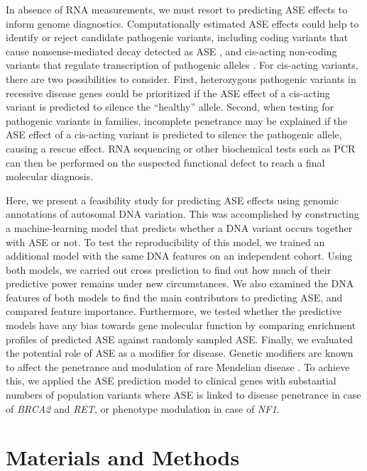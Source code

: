 \documentclass{book}
\begin{document}
\begin{refsection}
In absence of RNA measurements, we must resort to predicting ASE effects to inform genome diagnostics.
Computationally estimated ASE effects could help to identify or reject candidate pathogenic variants, including coding variants that cause nonsense-mediated decay detected as ASE \cite{Miller2014Nonsense}, and cis-acting non-coding variants that regulate transcription of pathogenic alleles \cite{Rao2019Allele}.
For cis-acting variants, there are two possibilities to consider.
First, heterozygous pathogenic variants in recessive disease genes could be prioritized if the ASE effect of a cis-acting variant is predicted to silence the \enquote{healthy} allele.
Second, when testing for pathogenic variants in families, incomplete penetrance may be explained if the ASE effect of a cis-acting variant is predicted to silence the pathogenic allele, causing a rescue effect.
RNA sequencing or other biochemical tests such as PCR can then be performed on the suspected functional defect to reach a final molecular diagnosis.

Here, we present a feasibility study for predicting ASE effects using genomic annotations of autosomal DNA variation.
This was accomplished by constructing a machine-learning model that predicts whether a DNA variant occurs together with ASE or not.
To test the reproducibility of this model, we trained an additional model with the same DNA features on an independent cohort.
Using both models, we carried out cross prediction to find out how much of their predictive power remains under new circumstances.
We also examined the DNA features of both models to find the main contributors to predicting ASE, and compared feature importance.
Furthermore, we tested whether the predictive models have any bias towards gene molecular function by comparing enrichment profiles of predicted ASE against randomly sampled ASE.
Finally, we evaluated the potential role of ASE as a modifier for disease.
Genetic modifiers are known to affect the penetrance and modulation of rare Mendelian disease \cite{Rahit2020Genetic}.
  To achieve this, we applied the ASE prediction model to clinical genes with substantial numbers of population variants where ASE is linked to disease penetrance in case of \textit{BRCA2}\cite{Maia2012Effects} and \textit{RET}\cite{Emison2010Differential}, or phenotype modulation in case of \textit{NF1}\cite{Jentarra2011Skewed}.

\section*{Materials and Methods}


\end{refsection}
\end{document}
